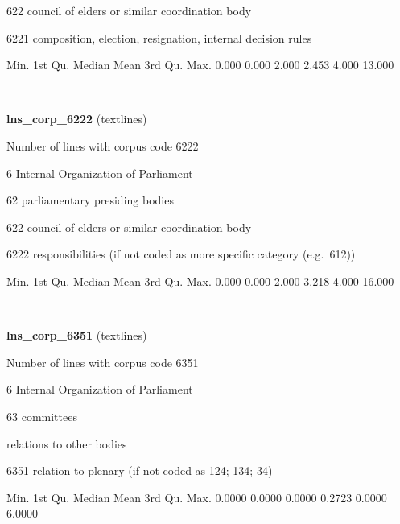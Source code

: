 \documentclass[]{article}
\newenvironment{Shaded}{\begin{snugshade}}{\end{snugshade}}
\newcommand{\FloatTok}[1]{\textcolor[rgb]{0.00,0.00,0.81}{{#1}}}
\newcommand{\NormalTok}[1]{{#1}}
\begin{document}
622 council of elders or similar coordination body

6221 composition, election, resignation, internal decision rules

\begin{Shaded}
\begin{Highlighting}[]
   \NormalTok{Min. 1st Qu.  Median    Mean 3rd Qu.    Max. }
  \FloatTok{0.000}   \FloatTok{0.000}   \FloatTok{2.000}   \FloatTok{2.453}   \FloatTok{4.000}  \FloatTok{13.000} 
\end{Highlighting}
\end{Shaded}

~

\vspace{1em}

\textbf{lns\_corp\_6222} (textlines)

Number of lines with corpus code 6222

6 Internal Organization of Parliament

62 parliamentary presiding bodies

622 council of elders or similar coordination body

6222 responsibilities (if not coded as more specific category
(e.g.~612))

\begin{Shaded}
\begin{Highlighting}[]
   \NormalTok{Min. 1st Qu.  Median    Mean 3rd Qu.    Max. }
  \FloatTok{0.000}   \FloatTok{0.000}   \FloatTok{2.000}   \FloatTok{3.218}   \FloatTok{4.000}  \FloatTok{16.000} 
\end{Highlighting}
\end{Shaded}

~

\vspace{1em}

\textbf{lns\_corp\_6351} (textlines)

Number of lines with corpus code 6351

6 Internal Organization of Parliament

63 committees

relations to other bodies

6351 relation to plenary (if not coded as 124; 134; 34)

\begin{Shaded}
\begin{Highlighting}[]
   \NormalTok{Min. 1st Qu.  Median    Mean 3rd Qu.    Max. }
 \FloatTok{0.0000}  \FloatTok{0.0000}  \FloatTok{0.0000}  \FloatTok{0.2723}  \FloatTok{0.0000}  \FloatTok{6.0000} 
\end{Highlighting}
\end{Shaded}
\end{document}
